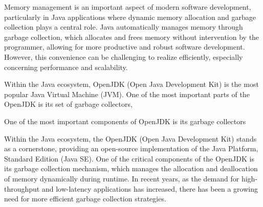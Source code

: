 

Memory management is an important aspect of modern software development, particularly in Java applications where dynamic memory allocation and garbage collection plays a central role. Java automatically manages memory through garbage collection, which allocates and frees memory without intervention by the programmer, allowing for more productive and robust software development. However, this convenience can be challenging to realize efficiently, especially concerning performance and scalability.

Within the Java ecosystem, OpenJDK (Open Java Development Kit) is the most popular Java Virtual Machine (JVM). One of the most important parts of the OpenJDK is its set of garbage collectors,

One of the most important components of OpenJDK is its garbage collectors

Within the Java ecosystem, the OpenJDK (Open Java Development Kit) stands as a cornerstone, providing an open-source implementation of the Java Platform, Standard Edition (Java SE). One of the critical components of the OpenJDK is its garbage collection mechanism, which manages the allocation and deallocation of memory dynamically during runtime. In recent years, as the demand for high-throughput and low-latency applications has increased, there has been a growing need for more efficient garbage collection strategies.






